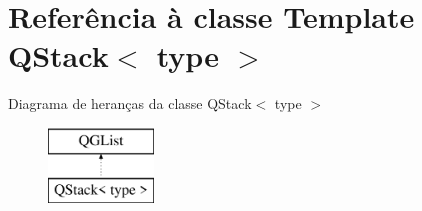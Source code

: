 \hypertarget{class_q_stack}{\section{Referência à classe Template Q\-Stack$<$ type $>$}
\label{class_q_stack}
}
Diagrama de heranças da classe Q\-Stack$<$ type $>$\begin{figure}[H]
\begin{center}
\leavevmode
\includegraphics[height=2.000000cm]{class_q_stack}
\end{center}
\end{figure}
